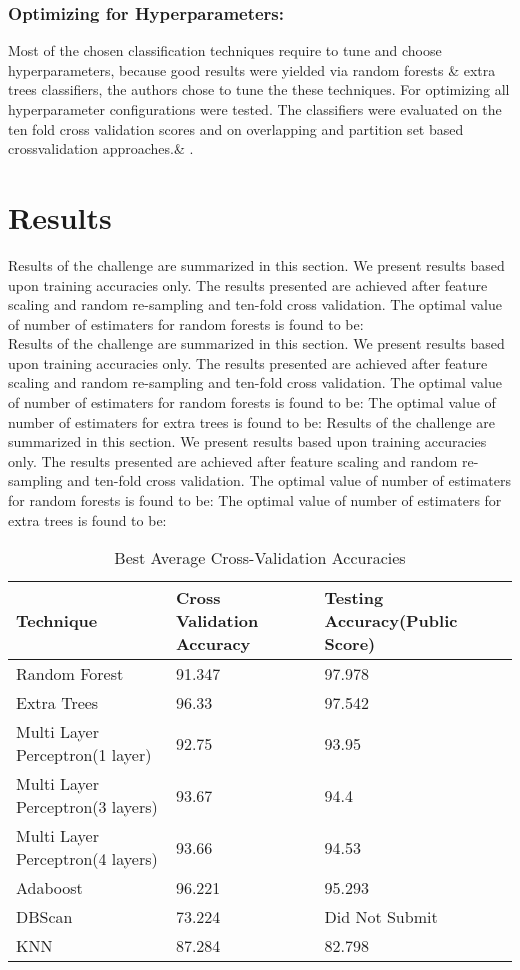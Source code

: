 \documentclass{llncs}
\begin{document}
\subsubsection{Optimizing for Hyperparameters:} Most  of the chosen classification techniques require to tune and choose hyperparameters, because good results were yielded via random forests \& extra trees classifiers, the authors chose to tune the these techniques. For optimizing all hyperparameter configurations were tested. The classifiers were evaluated on the ten fold cross validation scores and on overlapping and partition set based crossvalidation approaches.\& .  

\section{Results}
Results of the challenge are summarized in this section. We present results based upon training accuracies only. The results presented are achieved after feature scaling and random re-sampling and ten-fold cross validation. 
The optimal value of number of estimaters for random forests is found to be:\\
Results of the challenge are summarized in this section. We present results based upon training accuracies only. The results presented are achieved after feature scaling and random re-sampling and ten-fold cross validation. 
The optimal value of number of estimaters for random forests is found to be:
The optimal value of number of estimaters for extra trees is found to be:
Results of the challenge are summarized in this section. We present results based upon training accuracies only. The results presented are achieved after feature scaling and random re-sampling and ten-fold cross validation. 
The optimal value of number of estimaters for random forests is found to be:
The optimal value of number of estimaters for extra trees is found to be:

\begin{table}[h]
	\centering
	\caption{Best Average Cross-Validation Accuracies}
	\begin{tabular}{ |p{3cm}||p{3cm}||p{3cm}|}
		\hline
		Technique                  &Cross Validation Accuracy & Testing Accuracy(Public Score)\\
		\hline
		Random Forest              								&91.347 &97.978\\
		Extra Trees													&96.33 &97.542\\
		Multi Layer Perceptron(1 layer)	 			  		&92.75 &93.95\\
		Multi Layer Perceptron(3 layers)	 			  &93.67 &94.4\\
		Multi Layer Perceptron(4 layers)	 			  &93.66 &94.53\\
		Adaboost	 					            &96.221 &95.293\\
		DBScan	 						             &73.224 &Did Not Submit\\
		KNN              				               &87.284 &82.798\\

		 \hline
	\end{tabular}
	\label{table}
\end{table}
\end{document}
